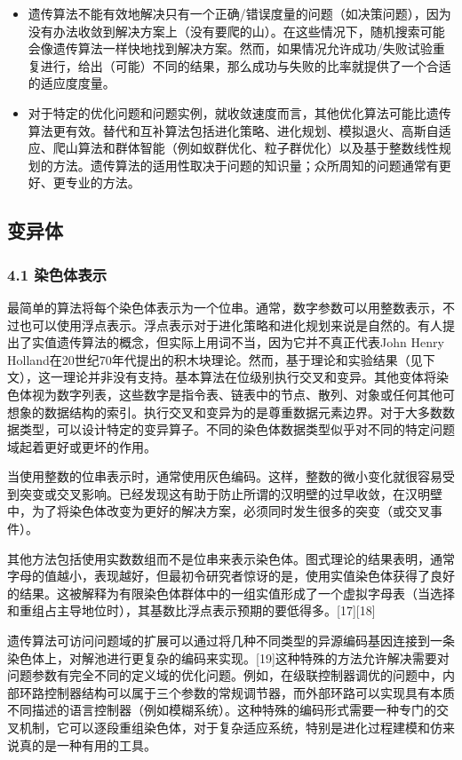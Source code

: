 \begin{itemize}
\item 遗传算法不能有效地解决只有一个正确/错误度量的问题（如决策问题），因为没有办法收敛到解决方案上（没有要爬的山）。在这些情况下，随机搜索可能会像遗传算法一样快地找到解决方案。然而，如果情况允许成功/失败试验重复进行，给出（可能）不同的结果，那么成功与失败的比率就提供了一个合适的适应度度量。
\item 对于特定的优化问题和问题实例，就收敛速度而言，其他优化算法可能比遗传算法更有效。替代和互补算法包括进化策略、进化规划、模拟退火、高斯自适应、爬山算法和群体智能（例如蚁群优化、粒子群优化）以及基于整数线性规划的方法。遗传算法的适用性取决于问题的知识量；众所周知的问题通常有更好、更专业的方法。
\end{itemize}

\subsection{变异体}
\subsubsection{4.1 染色体表示}
最简单的算法将每个染色体表示为一个位串。通常，数字参数可以用整数表示，不过也可以使用浮点表示。浮点表示对于进化策略和进化规划来说是自然的。有人提出了实值遗传算法的概念，但实际上用词不当，因为它并不真正代表John Henry Holland在20世纪70年代提出的积木块理论。然而，基于理论和实验结果（见下文），这一理论并非没有支持。基本算法在位级别执行交叉和变异。其他变体将染色体视为数字列表，这些数字是指令表、链表中的节点、散列、对象或任何其他可想象的数据结构的索引。执行交叉和变异为的是尊重数据元素边界。对于大多数数据类型，可以设计特定的变异算子。不同的染色体数据类型似乎对不同的特定问题域起着更好或更坏的作用。

当使用整数的位串表示时，通常使用灰色编码。这样，整数的微小变化就很容易受到突变或交叉影响。已经发现这有助于防止所谓的汉明壁的过早收敛，在汉明壁中，为了将染色体改变为更好的解决方案，必须同时发生很多的突变（或交叉事件）。

其他方法包括使用实数数组而不是位串来表示染色体。图式理论的结果表明，通常字母的值越小，表现越好，但最初令研究者惊讶的是，使用实值染色体获得了良好的结果。这被解释为有限染色体群体中的一组实值形成了一个虚拟字母表（当选择和重组占主导地位时），其基数比浮点表示预期的要低得多。[17][18]

遗传算法可访问问题域的扩展可以通过将几种不同类型的异源编码基因连接到一条染色体上，对解池进行更复杂的编码来实现。[19]这种特殊的方法允许解决需要对问题参数有完全不同的定义域的优化问题。例如，在级联控制器调优的问题中，内部环路控制器结构可以属于三个参数的常规调节器，而外部环路可以实现具有本质不同描述的语言控制器（例如模糊系统）。这种特殊的编码形式需要一种专门的交叉机制，它可以逐段重组染色体，对于复杂适应系统，特别是进化过程建模和仿来说真的是一种有用的工具。

